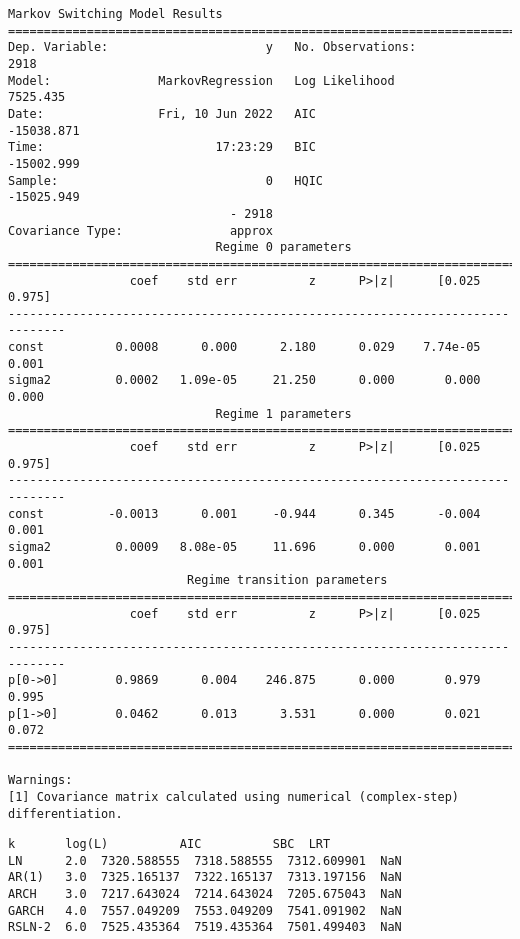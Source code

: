 \documentclass[11pt]{article}
\makeatletter
\newcommand{\boxspacing}{\kern\kvtcb@left@rule\kern\kvtcb@boxsep}
\newcommand{\prompt}[4]{
        {\ttfamily\llap{{\color{#2}[#3]:\hspace{3pt}#4}}\vspace{-\baselineskip}}
    }
\makeatother
\begin{document}
    \begin{Verbatim}[commandchars=\\\{\}]
                        Markov Switching Model Results
==============================================================================
Dep. Variable:                      y   No. Observations:                 2918
Model:               MarkovRegression   Log Likelihood                7525.435
Date:                Fri, 10 Jun 2022   AIC                         -15038.871
Time:                        17:23:29   BIC                         -15002.999
Sample:                             0   HQIC                        -15025.949
                               - 2918
Covariance Type:               approx
                             Regime 0 parameters
==============================================================================
                 coef    std err          z      P>|z|      [0.025      0.975]
------------------------------------------------------------------------------
const          0.0008      0.000      2.180      0.029    7.74e-05       0.001
sigma2         0.0002   1.09e-05     21.250      0.000       0.000       0.000
                             Regime 1 parameters
==============================================================================
                 coef    std err          z      P>|z|      [0.025      0.975]
------------------------------------------------------------------------------
const         -0.0013      0.001     -0.944      0.345      -0.004       0.001
sigma2         0.0009   8.08e-05     11.696      0.000       0.001       0.001
                         Regime transition parameters
==============================================================================
                 coef    std err          z      P>|z|      [0.025      0.975]
------------------------------------------------------------------------------
p[0->0]        0.9869      0.004    246.875      0.000       0.979       0.995
p[1->0]        0.0462      0.013      3.531      0.000       0.021       0.072
==============================================================================

Warnings:
[1] Covariance matrix calculated using numerical (complex-step) differentiation.
    \end{Verbatim}

            \begin{tcolorbox}[breakable, size=fbox, boxrule=.5pt, pad at break*=1mm, opacityfill=0]
\prompt{Out}{outcolor}{6}{\boxspacing}
\begin{Verbatim}[commandchars=\\\{\}]
          k       log(L)          AIC          SBC  LRT
LN      2.0  7320.588555  7318.588555  7312.609901  NaN
AR(1)   3.0  7325.165137  7322.165137  7313.197156  NaN
ARCH    3.0  7217.643024  7214.643024  7205.675043  NaN
GARCH   4.0  7557.049209  7553.049209  7541.091902  NaN
RSLN-2  6.0  7525.435364  7519.435364  7501.499403  NaN
\end{Verbatim}
\end{tcolorbox}
\end{document}
